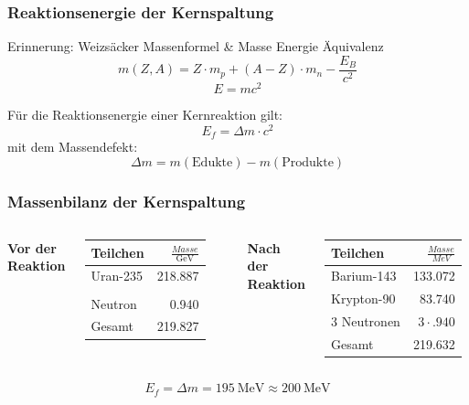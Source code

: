 \documentclass{beamer}[9pt]
\begin{document}
\begin{frame}
\frametitle{Reaktionsenergie der Kernspaltung}

\begin{block}{Erinnerung: Weizsäcker Massenformel \& Masse Energie Äquivalenz}
\[
m(Z,A) = Z \cdot m_p + (A-Z)\cdot m_n - \frac{E_B}{c^2}
\]
\[
E = mc^2
\]
\end{block}

Für die Reaktionsenergie einer Kernreaktion gilt:
\[
E_f = \Delta m \cdot c^2
\]
mit dem Massendefekt:
\[
\Delta m = m(\mathrm {Edukte})-m(\mathrm{Produkte})
\]
\end{frame}

\begin{frame}
\frametitle{Massenbilanz der Kernspaltung}

\centering
\begin{columns}
\centering
{}


\textbf{Vor der Reaktion}

\vspace*{0.5cm}
\begin{tabular}{lr}
\toprule
	Teilchen & $\frac{Masse}{\si{\giga\eV}}$ \\
\midrule	
	Uran-235 & \num{218.887}\\
	\\
	Neutron & \num{.940}\\
	\midrule
	Gesamt & 219.827\\
	\bottomrule
	
\end{tabular}

\centering
\textbf{Nach der Reaktion}

\vspace*{0.5cm}
\begin{tabular}{lr}
\toprule
	Teilchen & $\frac{Masse}{MeV}$ \\
\midrule	
	Barium-143 & \num{133.072}\\
	Krypton-90 & \num{83.740}\\
	3 Neutronen & $3 \cdot\num{.940}$\\ 
	\midrule
	Gesamt & \num{219.632}\\
	\bottomrule
\end{tabular}
\end{columns}
\vspace{0.5cm}
\[
E_f = \Delta m = \SI{195}{\MeV} \approx  \SI{200}{\MeV} 
\]
\end{frame}
\end{document}
